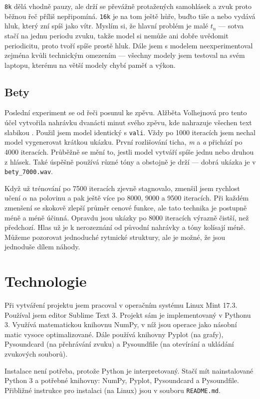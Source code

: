 \documentclass[a4]{article}
\begin{document}
\verb|8k| dělá vhodně pauzy, ale drží se převážně protažených samohlásek a zvuk proto běžnou řeč příliš nepřipomíná. \verb|16k| je na tom ještě hůře, buďto tiše  a nebo vydává hluk, který zní spíš jako vítr. Myslím si, že hlavní problém je malé $t_n$ --- sotva stačí na jednu periodu zvuku, takže model si nemůže ani dobře uvědomit periodicitu, proto tvoří spíše prostě hluk. Dále jsem s modelem neexperimentoval zejména kvůli technickým omezením --- všechny modely jsem testoval na svém laptopu, kterému na větší modely chybí paměť a výkon.

\subsection{Bety}
Poslední experiment se od řeči posunul ke zpěvu. Alžběta Volhejnová pro tento účel vytvořila nahrávku dvanácti minut svého zpěvu, kde nahrazuje všechen text slabikou . Použil jsem model identický s \verb|vali|.  Vždy po 1000 iteracích jsem nechal model vygenerovat krátkou ukázku. První rozlišování ticha, \textit{m} a \textit{a} přichází po 4000 iteracích. Průběžně se mění to, jestli model vytváří spíše jednu nebo druhou z hlásek. Také úspěšně používá různé tóny a obstojně je drží --- dobrá ukázka je v \verb|bety_7000.wav|.

Když už trénování po 7500 iteracích zjevně stagnovalo, zmenšil jsem rychlost učení $\alpha$ na polovinu a pak ještě více po 8000, 9000 a 9500 iteracích. Při každém zmenšení se skokově zlepší průměr cenové funkce, ale tato technika je postupně méně a méně účinná. Opravdu jsou ukázky po 8000 iteracích výrazně čistší, než předchozí. Hlas už je k nerozeznání od původní nahrávky a tóny kolísají méně. Můžeme pozorovat jednoduché rytmické struktury, ale je možné, že jsou jednoduše dílem náhody.

\section{Technologie}
Při vytváření projektu jsem pracoval v operačním systému Linux Mint 17.3. Používal jsem editor Sublime Text 3. Projekt sám je implementovaný v Pythonu 3. Využívá matematickou knihovnu NumPy, v níž jsou operace jako násobní matic vysoce optimalizované. Dále používá knihovny Pyplot (na grafy), Pysoundcard (na přehrávání zvuku) a Pysoundfile (na otevírání a ukládání zvukových souborů).

Instalace není potřeba, protože Python je interpretovaný. Stačí mít nainstalované Python 3 a potřebné knihovny: NumPy, Pyplot, Pysoundcard a Pysoundfile. Přibližné instrukce pro instalaci (na Linux) jsou v souboru \verb|README.md|.
\end{document}
